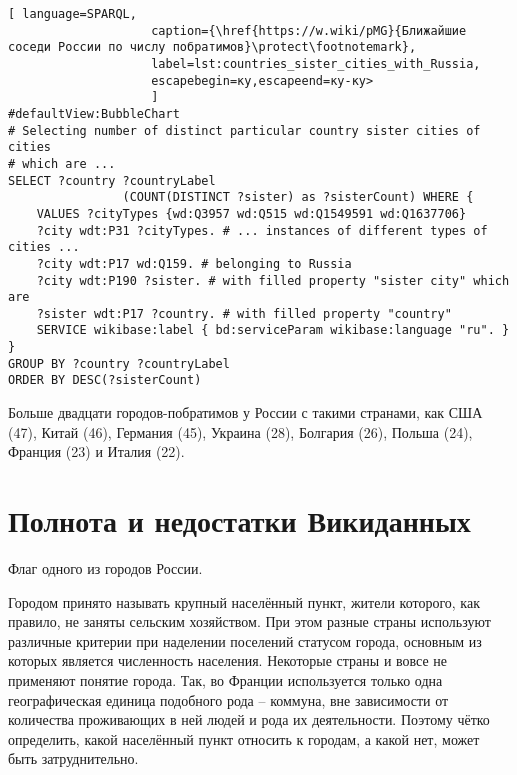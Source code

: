 \begin{lstlisting}[ language=SPARQL, 
                    caption={\href{https://w.wiki/pMG}{Ближайшие соседи России по числу побратимов}\protect\footnotemark},
                    label=lst:countries_sister_cities_with_Russia, 
                    escapebegin=ку,escapeend=ку-ку>
                    ]
#defaultView:BubbleChart
# Selecting number of distinct particular country sister cities of cities 
# which are ...
SELECT ?country ?countryLabel 
				(COUNT(DISTINCT ?sister) as ?sisterCount) WHERE {                                                
	VALUES ?cityTypes {wd:Q3957 wd:Q515 wd:Q1549591 wd:Q1637706}
	?city wdt:P31 ?cityTypes. # ... instances of different types of cities ...                                 
	?city wdt:P17 wd:Q159. # belonging to Russia
	?city wdt:P190 ?sister. # with filled property "sister city" which are
	?sister wdt:P17 ?country. # with filled property "country"
	SERVICE wikibase:label { bd:serviceParam wikibase:language "ru". }
}
GROUP BY ?country ?countryLabel
ORDER BY DESC(?sisterCount)
\end{lstlisting}

Больше двадцати городов-побратимов у России с такими странами, как США (47), Китай (46), Германия (45), Украина (28), Болгария (26), Польша (24), Франция (23) и Италия (22).

\section{Полнота и недостатки Викиданных}


\begin{marginfigure}[0.0cm]
{
\setlength{\fboxsep}{0pt}%
\setlength{\fboxrule}{1pt}%
%
}
  \caption{Флаг одного из городов России.}%
  \label{fig:flag_question_city}%
\end{marginfigure}


Городом принято называть крупный населённый пункт, жители которого, как правило, не заняты сельским хозяйством. При этом разные страны используют различные критерии при наделении поселений статусом города, основным из которых является численность населения. Некоторые страны и вовсе не применяют понятие города. Так, во Франции используется только одна географическая единица подобного рода -- коммуна, вне зависимости от количества проживающих в ней людей и рода их деятельности. Поэтому чётко определить, какой населённый пункт относить к городам, а какой нет, может быть затруднительно.

